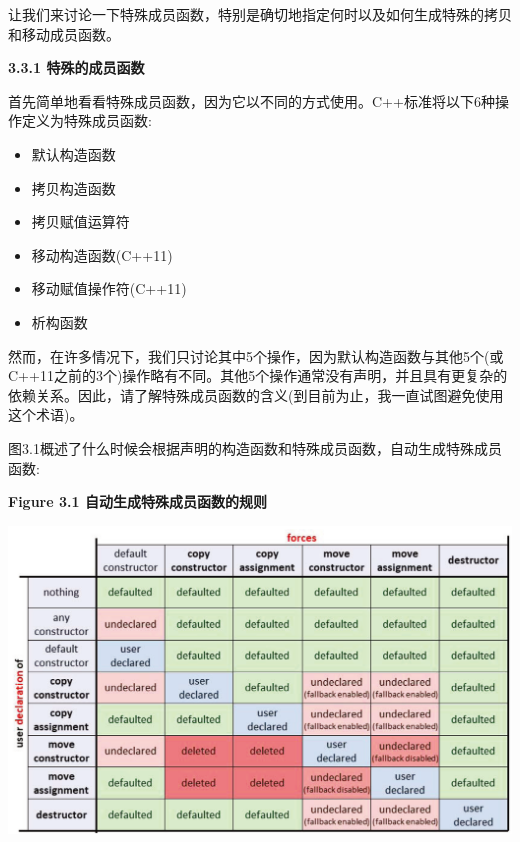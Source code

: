 让我们来讨论一下特殊成员函数，特别是确切地指定何时以及如何生成特殊的拷贝和移动成员函数。\par

\hspace*{\fill} \par %
\textbf{3.3.1 特殊的成员函数}

首先简单地看看特殊成员函数，因为它以不同的方式使用。C++标准将以下6种操作定义为特殊成员函数:\par

\begin{itemize}
	\item 默认构造函数
	\item 拷贝构造函数
	\item 拷贝赋值运算符
	\item 移动构造函数(C++11)
	\item 移动赋值操作符(C++11)
	\item 析构函数
\end{itemize}

然而，在许多情况下，我们只讨论其中5个操作，因为默认构造函数与其他5个(或C++11之前的3个)操作略有不同。其他5个操作通常没有声明，并且具有更复杂的依赖关系。因此，请了解特殊成员函数的含义(到目前为止，我一直试图避免使用这个术语)。\par

图3.1概述了什么时候会根据声明的构造函数和特殊成员函数，自动生成特殊成员函数:\par

\hspace*{\fill} \par %
\textbf{Figure 3.1 自动生成特殊成员函数的规则}\par

\begin{center}
	\includegraphics[width=1.0\textwidth]{content/1/chapter3/images/1}
\end{center}


